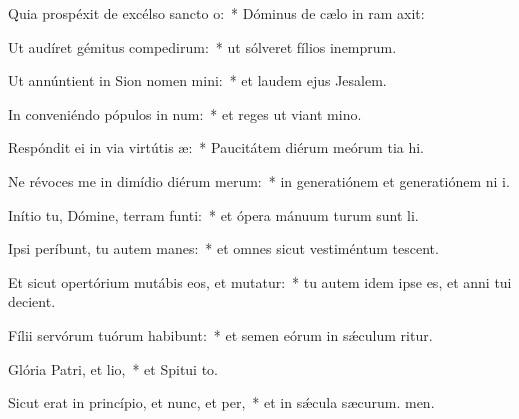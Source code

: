 \item Quia prospéxit de excélso sancto o:~* Dóminus de cælo in ram axit:
\item Ut audíret gémitus compedirum:~* ut sólveret fílios inemprum.
\item Ut annúntient in Sion nomen mini:~* et laudem ejus  Jesalem.
\item In conveniéndo pópulos in num:~* et reges ut viant mino.
\item Respóndit ei in via virtútis æ:~* Paucitátem diérum meórum tia hi.
\item Ne révoces me in dimídio diérum merum:~* in generatiónem et generatiónem ni i.
\item Inítio tu, Dómine, terram funti:~* et ópera mánuum turum sunt li.
\item Ipsi períbunt, tu autem manes:~* et omnes sicut vestiméntum tescent.
\item Et sicut opertórium mutábis eos, et mutatur:~* tu autem idem ipse es, et anni tui  decient.
\item Fílii servórum tuórum habibunt:~* et semen eórum in sǽculum ritur.
\item Glória Patri, et lio,~* et Spitui to.
\item Sicut erat in princípio, et nunc, et per,~* et in sǽcula sæcurum. men.
